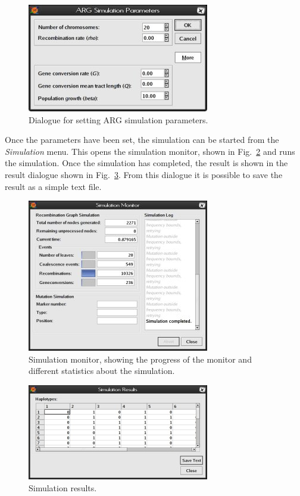 \documentclass{manual}
\begin{document}
\begin{figure}[tp]
  \centering
  \includegraphics{figs/arg-parameters}
  \caption{Dialogue for setting ARG simulation parameters.}
  \label{fig:arg-parameters}
\end{figure}

Once the parameters have been set, the simulation can be started from
the \emph{Simulation} menu.  This opens the simulation monitor, shown
in Fig.~\ref{fig:monitor} and runs the simulation.  Once the
simulation has completed, the result is shown in the result dialogue
shown in Fig.~\ref{fig:results}.  From this dialogue it is possible to
save the result as a simple text file.

\begin{figure}[tp]
  \centering
  \includegraphics{figs/monitor}
  \caption{Simulation monitor, showing the progress of the monitor and
  different statistics about the simulation.}
  \label{fig:monitor}
\end{figure}

\begin{figure}[tp]
  \centering
  \includegraphics{figs/results}
  \caption{Simulation results.}
  \label{fig:results}
\end{figure}
\end{document}
